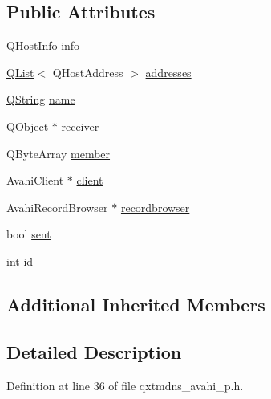 \subsection*{Public Attributes}
\begin{DoxyCompactItemize}
\item 
Q\-Host\-Info \hyperlink{class_qxt_m_d_n_s_private_a094d2f2bc58a87ba07e2afa43f91652f}{info}
\item 
\hyperlink{class_q_list}{Q\-List}$<$ Q\-Host\-Address $>$ \hyperlink{class_qxt_m_d_n_s_private_a75d9132bdaccbcf9c1e7a375941613bd}{addresses}
\item 
\hyperlink{group___u_a_v_objects_plugin_gab9d252f49c333c94a72f97ce3105a32d}{Q\-String} \hyperlink{class_qxt_m_d_n_s_private_acf3fda20dc948af2f060c90a042dc545}{name}
\item 
Q\-Object $\ast$ \hyperlink{class_qxt_m_d_n_s_private_acfd639c9dc24a9f61a9ced21f723e5c9}{receiver}
\item 
Q\-Byte\-Array \hyperlink{class_qxt_m_d_n_s_private_a9bbde3018309b137822a25b740e1f8c8}{member}
\item 
Avahi\-Client $\ast$ \hyperlink{class_qxt_m_d_n_s_private_ab9f30eec80344cb5c8e162a2ca581af4}{client}
\item 
Avahi\-Record\-Browser $\ast$ \hyperlink{class_qxt_m_d_n_s_private_a5614d288f518b9f735c2653b4d910f98}{recordbrowser}
\item 
bool \hyperlink{class_qxt_m_d_n_s_private_aa1cffbdc147c9f9e15eb8b96b8845982}{sent}
\item 
\hyperlink{ioapi_8h_a787fa3cf048117ba7123753c1e74fcd6}{int} \hyperlink{class_qxt_m_d_n_s_private_ab2f6f2e09886b6cb9f2cd447fc90399a}{id}
\end{DoxyCompactItemize}
\subsection*{Additional Inherited Members}


\subsection{Detailed Description}


Definition at line 36 of file qxtmdns\-\_\-avahi\-\_\-p.\-h.



